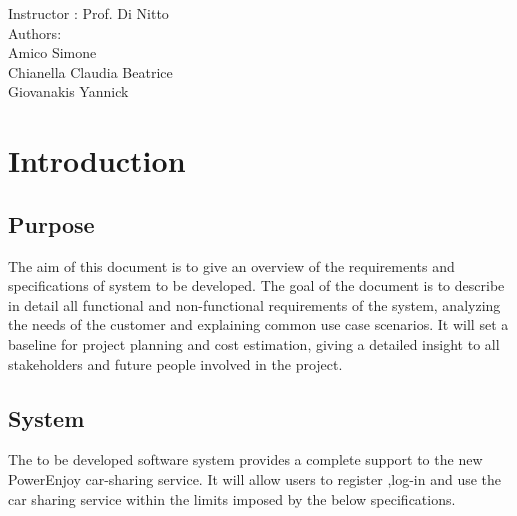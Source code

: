 \documentclass[11pt]{article}
\begin{document}
	 \begin{center}
	 	{\Large Instructor : Prof. Di Nitto}
	 	\vspace{5mm}\\	 
	 	{\Large Authors:}\\
	 	{\Large Amico Simone}\\
	 	{\Large Chianella Claudia Beatrice}\\
	 	{\Large Giovanakis Yannick}
	 \end{center}
	 
	 \newpage
	 
	 \tableofcontents{}
	 
	 \newpage
	 
	 \section{\Large Introduction}
	 
	 \subsection{Purpose}
		The aim of this document	is to give an overview of the 	requirements and specifications of system to be developed. 
		The goal of the document is to describe in detail all functional and non-functional requirements of the system, analyzing the needs of the customer and explaining common use case scenarios.
		It will set a baseline for project planning and cost estimation, giving a detailed insight to all stakeholders and future people involved in the project.
	 
	 \subsection{System}
	 The to be developed software system provides a complete support to the new PowerEnjoy car-sharing service. It will allow users to register ,log-in and use the car sharing service within the limits imposed by the below specifications.
	 
\end{document}
